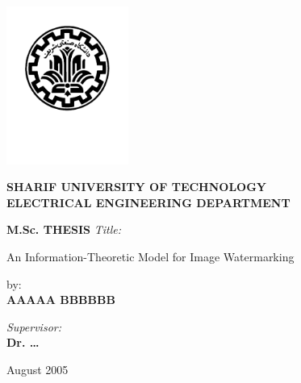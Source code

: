 \thispagestyle{empty}

\begin{latin}
\centering
\vspace*{-2.5cm}
\includegraphics[width=4cm]{Sharif_Logo.pdf}
\vspace*{-1.5cm}

{\large \bf SHARIF UNIVERSITY OF TECHNOLOGY} \\
{\bf ELECTRICAL ENGINEERING DEPARTMENT}

\vspace{2cm}

{\large \bf M.Sc. THESIS}
\vskip 1cm
{\sl Title:}\\

\baselineskip
{\huge \bf 

An Information-Theoretic Model for Image Watermarking
}\par

\vfil

by:\\
\vspace{-2mm}
{\large \bf AAAAA   BBBBBB}

\vfil

{\sl Supervisor:}\\
\vspace{-1mm}
{\large \bf Dr. \dots\\}




\vfil

{August 2005}
\par
\end{latin}

